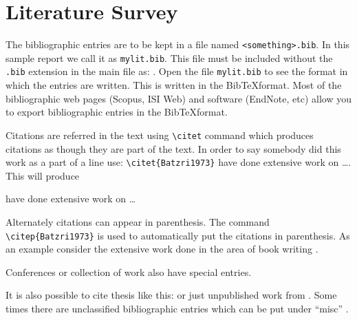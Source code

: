 
\chapter{Literature Survey}

The bibliographic entries are to be kept in a file named
\verb|<something>.bib|. In this sample report we call it as
\verb|mylit.bib|. This file must be included without the \verb|.bib|
extension in the main file as: \verb||.   Open the
file \verb|mylit.bib| to see the format in which the entries are
written. This is written in the Bib\TeX format. Most of the
bibliographic web pages (Scopus, ISI Web) and software (EndNote, etc)
allow you to export bibliographic entries in the Bib\TeX format.

Citations are referred in the text using \verb|\citet| command which produces
citations as though they are part of the text.  In order to say
somebody did this work as a part of a line use:
\verb|\citet{Batzri1973}|
have done extensive work on \ldots.  This will produce

\citet{Batzri1973} have done extensive work on \ldots


Alternately citations can appear in parenthesis.  The
command \verb|\citep{Batzri1973}| is used to automatically put the
citations in parenthesis.
  As an example consider the extensive work
done in the area of book writing \citep{Sackmann1995a,Boal2012}.

Conferences \citep{rich-mart92} or collection of work
\citep{Sackmann1995a} also have special entries.

It is also possible to cite thesis like this:
\citet{jariwala00,luding94} or just unpublished work from
\citet{SunHI03}. Some times there are unclassified bibliographic
entries which can be put under ``misc'' \citep{Smith99}.



